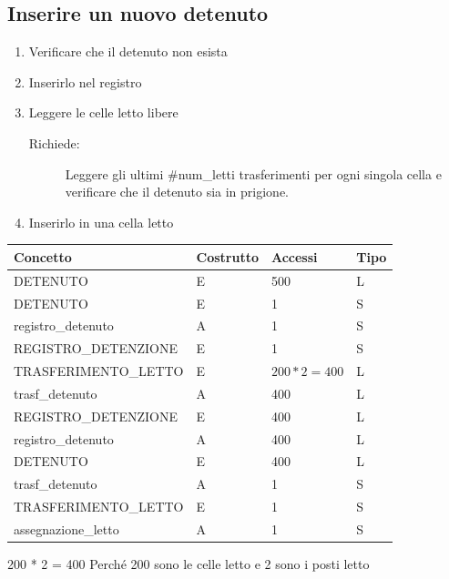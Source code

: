 \documentclass[a4paper,12pt]{report}
\begin{document}
\subsection{Inserire un nuovo detenuto}
\begin{enumerate}
    \item Verificare che il detenuto non esista
    \item Inserirlo nel registro
    \item Leggere le celle letto libere
        \begin{description}
            \item[Richiede:] Leggere gli ultimi \#num\_letti trasferimenti per ogni singola cella e verificare che il detenuto sia in prigione.
        \end{description}
    \item Inserirlo in una cella letto
\end{enumerate}
\begin{table}[H]
\begin{tabular}{p{5cm} p{2cm} p{1cm} p{1cm}}
\hline
Concetto & Costrutto & Accessi & Tipo \\ \hline
DETENUTO & E & 500 & L \\
DETENUTO & E & 1 & S \\
registro\_detenuto & A & 1 & S \\
REGISTRO\_DETENZIONE & E & 1 & S \\
TRASFERIMENTO\_LETTO & E & \(200 * 2 = 400\) & L \\
trasf\_detenuto & A & 400 & L \\
REGISTRO\_DETENZIONE & E & 400 & L \\
registro\_detenuto & A & 400 & L \\
DETENUTO & E & 400 & L \\
trasf\_detenuto & A & 1 & S \\
TRASFERIMENTO\_LETTO & E & 1 & S \\
assegnazione\_letto & A & 1 & S \\
\end{tabular}
\end{table}
200 * 2 = 400 Perché 200 sono le celle letto e 2 sono i posti letto
%
\end{document}
